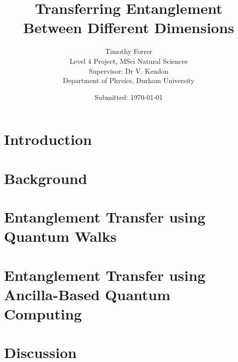 \documentclass[12pt, onecolumn]{article}
\begin{document}
\title{\bf{Transferring Entanglement Between Different Dimensions}} 
\date{Submitted: \today{}}
\author{
    Timothy Forrer\\
    Level 4 Project, MSci Natural Sciences\\
    Supervisor: Dr V. Kendon\\
    Department of Physics, Durham University}

\maketitle



\newpage

\tableofcontents

\newpage

\section{Introduction}
\label{section:intro}


\section{Background}
\label{section:background}

\label{subsection:qc_primer}

\label{subsection:entangle}

\label{subsection:qw}

\label{subsection:aqc}

\section{Entanglement Transfer using Quantum Walks}
\label{section:qw_transfer}


\section{Entanglement Transfer using Ancilla-Based Quantum Computing}
\label{section:aqc_transfer}


\section{Discussion}
\label{section:discussion}




\printbibliography[heading=bibintoc]

\newpage


\end{document}
